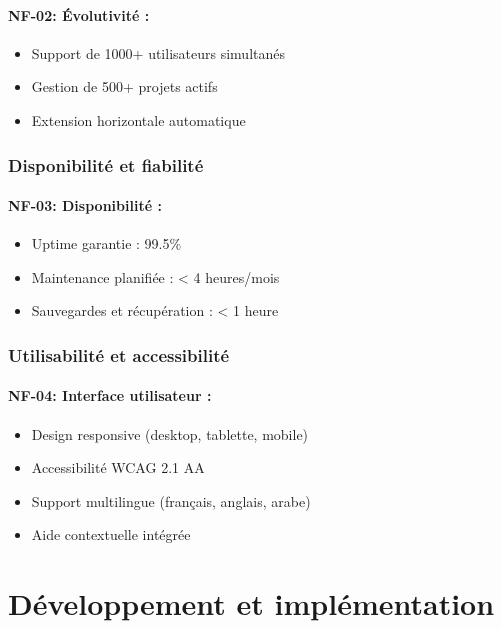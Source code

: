 \paragraph{NF-02: Évolutivité :}
\begin{itemize}
    \item Support de 1000+ utilisateurs simultanés
    \item Gestion de 500+ projets actifs
    \item Extension horizontale automatique
\end{itemize}

\subsubsection{Disponibilité et fiabilité}

\paragraph{NF-03: Disponibilité :}
\begin{itemize}
    \item Uptime garantie : 99.5\%
    \item Maintenance planifiée : < 4 heures/mois
    \item Sauvegardes et récupération : < 1 heure
\end{itemize}

\subsubsection{Utilisabilité et accessibilité}

\paragraph{NF-04: Interface utilisateur :}
\begin{itemize}
    \item Design responsive (desktop, tablette, mobile)
    \item Accessibilité WCAG 2.1 AA
    \item Support multilingue (français, anglais, arabe)
    \item Aide contextuelle intégrée
\end{itemize}

\section{Développement et implémentation}

